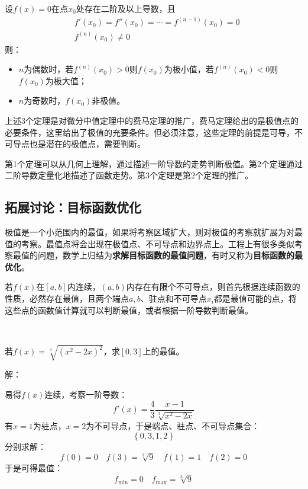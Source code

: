 \begin{theorem} \label{th_5_3_3}
设$f\left( x \right) =0$在点$x_0$处存在二阶及以上导数，且
\begin{align*}
&f'\left( x_0 \right) =f''\left( x_0 \right) =\cdots =f^{\left( n-1 \right)}\left( x_0 \right) =0 \\
&f^{\left( n \right)}\left( x_0 \right) \ne 0
\end{align*}
则：
\begin{itemize}
    \item $n$为偶数时，若$f^{\left( n \right)}\left( x_0 \right) >0$则$f\left( x_0 \right) $为极小值，若$f^{\left( n \right)}\left( x_0 \right) <0$则$f\left( x_0 \right) $为极大值；
    \item $n$为奇数时，$f\left( x_0 \right) $非极值。
\end{itemize}
\end{theorem}

上述3个定理是对微分中值定理中的费马定理的推广，费马定理给出的是极值点的必要条件，这里给出了极值的充要条件。但必须注意，这些定理的前提是可导，不可导点也是潜在的极值点，需要判断。

第1个定理可以从几何上理解，通过描述一阶导数的走势判断极值。第2个定理通过二阶导数定量化地描述了函数走势。第3个定理是第2个定理的推广。

\subsection{拓展讨论：目标函数优化}

极值是一个小范围内的最值，如果将考察区域扩大，则对极值的考察就扩展为对最值的考察。最值点将会出现在极值点、不可导点和边界点上。工程上有很多类似考察最值的问题，数学上归结为{\bf 求解目标函数的最值问题}，有时又称为{\bf 目标函数的最优化}。

若$f\left( x \right) $在$\left[ a,b \right] $内连续，$\left( a,b \right) $内存在有限个不可导点，则首先根据连续函数的性质，必然存在最值，且两个端点$a,b$、驻点和不可导点$x_i$都是最值可能的点，将这些点的函数值计算就可以判断最值，或者根据一阶导数判断最值。

~

\begin{example}
若$f\left( x \right) =\sqrt[3]{\left( x^2-2x \right) ^2}$，求$\left[ 0,3 \right] $上的最值。
\end{example}

解：

易得$f\left( x \right) $连续，考察一阶导数：
\[
f'\left( x \right) =\frac{4}{3}\frac{x-1}{\sqrt[3]{x^2-2x}}
\]
有$x=1$为驻点，$x=2$为不可导点，于是端点、驻点、不可导点集合：
\[
\left\{ 0,3,1,2 \right\}
\]
分别求解：
\[
f\left( 0 \right) =0 \quad f\left( 3 \right) =\sqrt[3]{9} \quad f\left( 1 \right) =1 \quad f\left( 2 \right) =0
\]
于是可得最值：
\[
f_{\min}=0 \quad f_{\max}=\sqrt[3]{9}
\]

